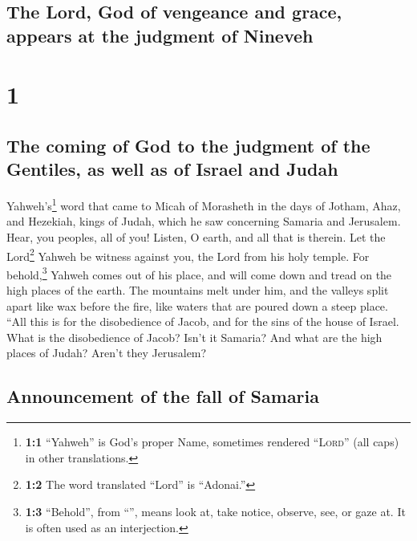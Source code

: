 \hypertarget{the-lord-god-of-vengeance-and-grace-appears-at-the-judgment-of-nineveh}{%
\subsection{The Lord, God of vengeance and grace, appears at the
judgment of
Nineveh}\label{the-lord-god-of-vengeance-and-grace-appears-at-the-judgment-of-nineveh}}

\hypertarget{section}{%
\section{1}\label{section}}

\hypertarget{the-coming-of-god-to-the-judgment-of-the-gentiles-as-well-as-of-israel-and-judah}{%
\subsection{The coming of God to the judgment of the Gentiles, as well
as of Israel and
Judah}\label{the-coming-of-god-to-the-judgment-of-the-gentiles-as-well-as-of-israel-and-judah}}

 Yahweh's\footnote{\textbf{1:1} ``Yahweh'' is God's proper
  Name, sometimes rendered ``\textsc{Lord}'' (all caps) in other
  translations.} word that came to Micah of Morasheth in the days of
Jotham, Ahaz, and Hezekiah, kings of Judah, which he saw concerning
Samaria and Jerusalem.  Hear, you peoples, all of you!
Listen, O earth, and all that is therein. Let the Lord\footnote{\textbf{1:2}
  The word translated ``Lord'' is ``Adonai.''} Yahweh be witness against
you, the Lord from his holy temple.  For
behold,\footnote{\textbf{1:3} ``Behold'', from ``'', means
  look at, take notice, observe, see, or gaze at. It is often used as an
  interjection.} Yahweh comes out of his place, and will come down and
tread on the high places of the earth.  The mountains melt
under him, and the valleys split apart like wax before the fire, like
waters that are poured down a steep place.  ``All this is
for the disobedience of Jacob, and for the sins of the house of Israel.
What is the disobedience of Jacob? Isn't it Samaria? And what are the
high places of Judah? Aren't they Jerusalem?

\hypertarget{announcement-of-the-fall-of-samaria}{%
\subsection{Announcement of the fall of
Samaria}\label{announcement-of-the-fall-of-samaria}}

